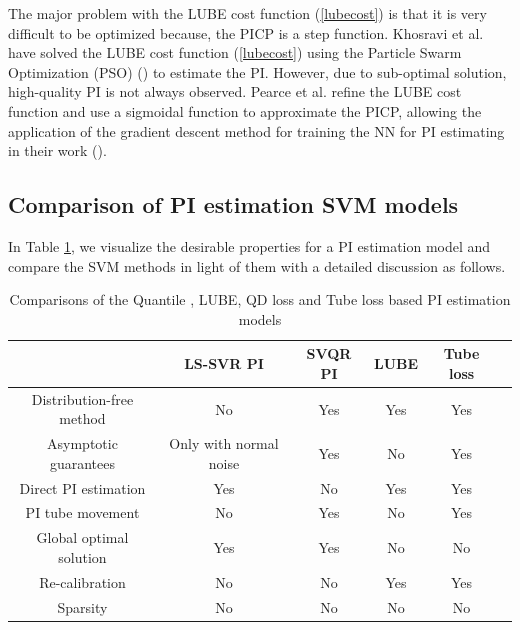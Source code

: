 \documentclass[10pt]{article} %
\begin{document}
The major problem with the LUBE cost function (\ref{lubecost}) is that it is very difficult to be optimized because, the PICP is a step function. Khosravi et al. have solved the  LUBE cost function (\ref{lubecost}) using the Particle Swarm Optimization (PSO) (\cite{kennedy1995particle}) to estimate the PI. However, due to sub-optimal solution, high-quality PI is not always observed. Pearce et al. refine the LUBE cost function and use a sigmoidal function to approximate the PICP, allowing the application of the gradient descent method for training  the NN for PI estimating in their work (\cite{pearce2018high}).


\subsection{Comparison of PI estimation SVM models}
In Table \ref{des_prop1}, we  visualize the desirable properties for a PI estimation model and compare the SVM methods in light of  them with a detailed discussion  as follows. 


\begin{table}[]
\centering
 \begin{tabular}{|c|c|c|c|c|c|}
 \hline
  &  LS-SVR PI &  SVQR PI &  LUBE  & Tube loss    \\ \hline
   Distribution-free method  & No  & Yes  & Yes  & Yes \\
      Asymptotic guarantees  & \footnotesize {Only with normal noise}  & Yes  & No  &  Yes \\
   Direct PI estimation   &  Yes & No & Yes & Yes  \\
    PI tube movement   & No  & Yes & No & Yes   \\
     Global optimal solution   & Yes  &  Yes & No  & No  \\
      Re-calibration   &  No  & No & Yes  & Yes  \\
       Sparsity   &  No  & No & No  & No  \\
    \hline  
 \end{tabular}
 \caption{ Comparisons of the Quantile , LUBE, QD loss and Tube loss based PI estimation models }
   \label{des_prop1}
 \end{table}
\end{document}
